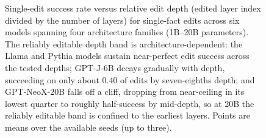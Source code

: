 \begin{figure}[t]
\centering

\caption{Single-edit success rate versus relative edit depth (edited layer
index divided by the number of layers) for single-fact edits across six models
spanning four architecture families (1B--20B parameters). The reliably editable
depth band is architecture-dependent: the Llama and Pythia models sustain
near-perfect edit success across the tested depths; GPT-J-6B decays gradually
with depth, succeeding on only about $0.40$ of edits by seven-eighths depth;
and GPT-NeoX-20B falls off a cliff, dropping from near-ceiling in its lowest
quarter to roughly half-success by mid-depth, so at 20B the reliably editable
band is confined to the earliest layers. Points are means over the available
seeds (up to three).}
\label{fig:band}
\end{figure}
